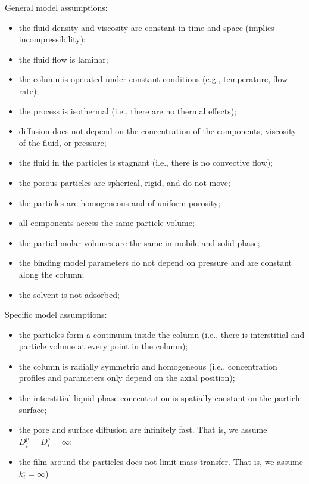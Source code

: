 \documentclass{article}
\begin{document}
General model assumptions:
\begin{itemize}
\item the fluid density and viscosity are constant in time and space (implies incompressibility);
\item the fluid flow is laminar;
\item the column is operated under constant conditions (e.g., temperature, flow rate);
\item the process is isothermal (i.e., there are no thermal effects);
\item diffusion does not depend on the concentration of the components, viscosity of the fluid, or pressure;
\item the fluid in the particles is stagnant (i.e., there is no convective flow);
\item the porous particles are spherical, rigid, and do not move;
\item the particles are homogeneous and of uniform porosity;
\item all components access the same particle volume;
\item the partial molar volumes are the same in mobile and solid phase;
\item the binding model parameters do not depend on pressure and are constant along the column;
\item the solvent is not adsorbed;
\end{itemize}


Specific model assumptions:
\begin{itemize}
\item the particles form a continuum inside the column (i.e., there is interstitial and particle volume at every point in the column);
\item the column is radially symmetric and homogeneous (i.e., concentration profiles and parameters only depend on the axial position);
\item the interstitial liquid phase concentration is spatially constant on the particle surface;
\item the pore and surface diffusion are infinitely fast. That is, we assume $D_{i}^{\mathrm{p}} = D_{i}^{\mathrm{s}} = \infty$;
\item the film around the particles does not limit mass transfer. That is, we assume $k^{\mathrm{f}}_i = \infty$)
\end{itemize}
\end{document}
